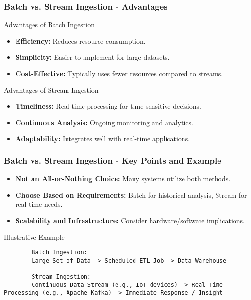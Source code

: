 \documentclass{beamer}
\begin{document}
\begin{frame}[fragile]
    \frametitle{Batch vs. Stream Ingestion - Advantages}
    
    \begin{block}{Advantages of Batch Ingestion}
        \begin{itemize}
            \item \textbf{Efficiency:} Reduces resource consumption.
            \item \textbf{Simplicity:} Easier to implement for large datasets.
            \item \textbf{Cost-Effective:} Typically uses fewer resources compared to streams.
        \end{itemize}
    \end{block}

    \begin{block}{Advantages of Stream Ingestion}
        \begin{itemize}
            \item \textbf{Timeliness:} Real-time processing for time-sensitive decisions.
            \item \textbf{Continuous Analysis:} Ongoing monitoring and analytics.
            \item \textbf{Adaptability:} Integrates well with real-time applications.
        \end{itemize}
    \end{block}
\end{frame}

\begin{frame}[fragile]
    \frametitle{Batch vs. Stream Ingestion - Key Points and Example}
    
    \begin{itemize}
        \item \textbf{Not an All-or-Nothing Choice:} Many systems utilize both methods.
        \item \textbf{Choose Based on Requirements:} Batch for historical analysis, Stream for real-time needs.
        \item \textbf{Scalability and Infrastructure:} Consider hardware/software implications.
    \end{itemize}

    \begin{block}{Illustrative Example}
        \begin{verbatim}
        Batch Ingestion:
        Large Set of Data -> Scheduled ETL Job -> Data Warehouse

        Stream Ingestion:
        Continuous Data Stream (e.g., IoT devices) -> Real-Time Processing (e.g., Apache Kafka) -> Immediate Response / Insight
        \end{verbatim}
    \end{block}
\end{frame}
\end{document}
